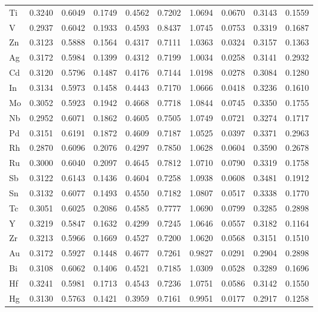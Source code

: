 \begin{table}[htbp]
{\begin{tabular}{l *{9}{l}}
      Ti & 0.3240 & 0.6049 & 0.1749 & 0.4562 & 0.7202 & 1.0694 & 0.0670 & 0.3143 & 0.1559 \\
      V  & 0.2937 & 0.6042 & 0.1933 & 0.4593 & 0.8437 & 1.0745 & 0.0753 & 0.3319 & 0.1687 \\
      Zn & 0.3123 & 0.5888 & 0.1564 & 0.4317 & 0.7111 & 1.0363 & 0.0324 & 0.3157 & 0.1363 \\
      Ag & 0.3172 & 0.5984 & 0.1399 & 0.4312 & 0.7199 & 1.0034 & 0.0258 & 0.3141 & 0.2932 \\
      Cd & 0.3120 & 0.5796 & 0.1487 & 0.4176 & 0.7144 & 1.0198 & 0.0278 & 0.3084 & 0.1280 \\
      In & 0.3134 & 0.5973 & 0.1458 & 0.4443 & 0.7170 & 1.0666 & 0.0418 & 0.3236 & 0.1610 \\
      Mo & 0.3052 & 0.5923 & 0.1942 & 0.4668 & 0.7718 & 1.0844 & 0.0745 & 0.3350 & 0.1755 \\
      Nb & 0.2952 & 0.6071 & 0.1862 & 0.4605 & 0.7505 & 1.0749 & 0.0721 & 0.3274 & 0.1717 \\
      Pd & 0.3151 & 0.6191 & 0.1872 & 0.4609 & 0.7187 & 1.0525 & 0.0397 & 0.3371 & 0.2963 \\
      Rh & 0.2870 & 0.6096 & 0.2076 & 0.4297 & 0.7850 & 1.0628 & 0.0604 & 0.3590 & 0.2678 \\
      Ru & 0.3000 & 0.6040 & 0.2097 & 0.4645 & 0.7812 & 1.0710 & 0.0790 & 0.3319 & 0.1758 \\
      Sb & 0.3122 & 0.6143 & 0.1436 & 0.4604 & 0.7258 & 1.0938 & 0.0608 & 0.3481 & 0.1912 \\
      Sn & 0.3132 & 0.6077 & 0.1493 & 0.4550 & 0.7182 & 1.0807 & 0.0517 & 0.3338 & 0.1770 \\
      Tc & 0.3051 & 0.6025 & 0.2086 & 0.4585 & 0.7777 & 1.0690 & 0.0799 & 0.3285 & 0.2898 \\
      Y  & 0.3219 & 0.5847 & 0.1632 & 0.4299 & 0.7245 & 1.0646 & 0.0557 & 0.3182 & 0.1164 \\
      Zr & 0.3213 & 0.5966 & 0.1669 & 0.4527 & 0.7200 & 1.0620 & 0.0568 & 0.3151 & 0.1510 \\
      Au & 0.3172 & 0.5927 & 0.1448 & 0.4677 & 0.7261 & 0.9827 & 0.0291 & 0.2904 & 0.2898 \\
      Bi & 0.3108 & 0.6062 & 0.1406 & 0.4521 & 0.7185 & 1.0309 & 0.0528 & 0.3289 & 0.1696 \\
      Hf & 0.3241 & 0.5981 & 0.1713 & 0.4543 & 0.7236 & 1.0751 & 0.0586 & 0.3142 & 0.1550 \\
      Hg & 0.3130 & 0.5763 & 0.1421 & 0.3959 & 0.7161 & 0.9951 & 0.0177 & 0.2917 & 0.1258 \\

\end{tabular}}
\end{table}
